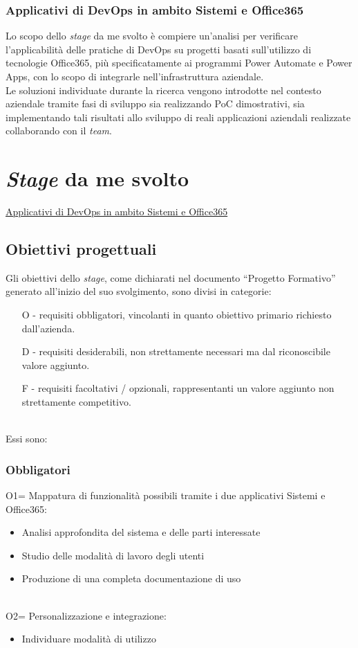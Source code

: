 \subsubsection*{Applicativi di \gls{DevOps} in ambito Sistemi e Office365}
\label{mioStage}
Lo scopo dello \emph{stage} da me svolto è compiere un'analisi per verificare l'applicabilità delle pratiche di \gls{DevOps} su progetti basati sull'utilizzo di tecnologie Office365, più specificatamente ai programmi Power Automate e Power Apps, con lo scopo di integrarle nell'infrastruttura aziendale.\\
Le soluzioni individuate durante la ricerca vengono introdotte nel contesto aziendale tramite fasi di sviluppo sia realizzando \gls{PoC} dimostrativi, sia implementando tali risultati allo sviluppo di reali applicazioni aziendali realizzate collaborando con il \emph{team}. 

\section{\emph{Stage} da me svolto}
\hyperref[mioStage]{Applicativi di DevOps in ambito Sistemi e Office365}
\subsection{Obiettivi progettuali}
Gli obiettivi dello \emph{stage}, come dichiarati nel documento “Progetto Formativo” generato all'inizio del suo svolgimento, sono divisi in categorie:
\begin{enumerate}
	\item[O -]requisiti obbligatori, vincolanti in quanto obiettivo primario richiesto dall'azienda.
    \item[D -]requisiti desiderabili, non strettamente necessari ma dal riconoscibile valore aggiunto.
    \item[F -]requisiti facoltativi / opzionali, rappresentanti un valore aggiunto non strettamente competitivo.\\\\
\end{enumerate}
Essi sono:
\subsubsection*{Obbligatori}
O1= Mappatura di funzionalità possibili tramite i due applicativi \gls{Sistemi} e Office365:
\begin{itemize}
    \item Analisi approfondita del sistema e delle parti interessate 
    \item Studio delle modalità di lavoro degli utenti 
    \item Produzione di una completa documentazione di uso\\\\
\end{itemize}
O2= Personalizzazione e integrazione:
\begin{itemize}
    \item Individuare modalità di utilizzo\\\\
\end{itemize}
